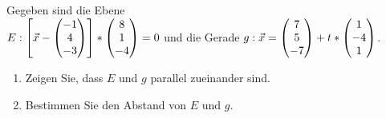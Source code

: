 Gegeben sind die Ebene \\$E: \left[ \vec x -  \begin{pmatrix} -1 \\ 4\\ -3 \end{pmatrix}\right]*\begin{pmatrix} 8\\ 1 \\-4 \end{pmatrix}=0$ und die Gerade $g: \vec x=\begin{pmatrix} 7\\5\\-7 \end{pmatrix}+t*\begin{pmatrix} 1\\-4\\1 \end{pmatrix}$.
\begin{enumerate}
	\item Zeigen Sie, dass $E$ und $g$ parallel zueinander sind.
	\item Bestimmen Sie den Abstand von $E$ und $g$.
\end{enumerate}


